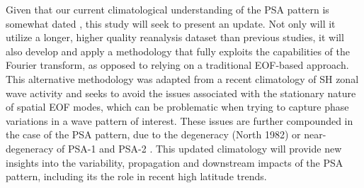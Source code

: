 Given that our current climatological understanding of the PSA pattern is somewhat dated \citep{Mo1998,Mo2001}, this study will seek to present an update. Not only will it utilize a longer, higher quality reanalysis dataset than previous studies, it will also develop and apply a methodology that fully exploits the capabilities of the Fourier transform, as opposed to relying on a traditional EOF-based approach. This alternative methodology was adapted from a recent climatology of SH zonal wave activity \citep{IrvingSimmonds2015} and seeks to avoid the issues associated with the stationary nature of spatial EOF modes, which can be problematic when trying to capture phase variations in a wave pattern of interest. These issues are further compounded in the case of the PSA pattern, due to the degeneracy (North 1982) or near-degeneracy of PSA-1 and PSA-2 \citep[e.g.][]{Mo2000}. This updated climatology will provide new insights into the variability, propagation and downstream impacts of the PSA pattern, including its the role in recent high latitude trends. 

